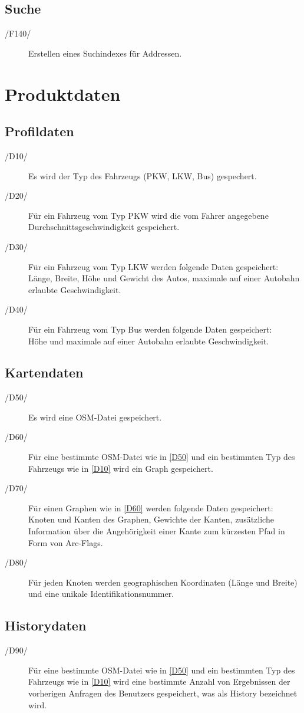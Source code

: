 \documentclass[a4paper, 11pt]{article}
\newcommand{\oitem}[1]{\item[/#1/\label{#1}]}
\begin{document}
\subsection{Suche}
\begin{description}
\oitem{F140}
Erstellen eines Suchindexes für Addressen.

\end{description}
\section{Produktdaten}
\subsection{Profildaten}
\begin{description}
\oitem{D10}
Es wird der Typ des Fahrzeugs (PKW, LKW, Bus) gespechert.
\oitem{D20}
Für ein Fahrzeug vom Typ  PKW wird die vom Fahrer angegebene Durchschnittsgeschwindigkeit gespeichert.
\oitem{D30}
Für ein Fahrzeug vom Typ  LKW werden folgende Daten gespeichert:\\
Länge, Breite, Höhe und Gewicht des Autos, maximale auf einer Autobahn erlaubte Geschwindigkeit.
\oitem{D40}
Für ein Fahrzeug vom Typ Bus werden folgende Daten gespeichert:\\
Höhe und maximale auf einer Autobahn erlaubte Geschwindigkeit.
\end{description}

\subsection{Kartendaten}
\begin{description}
\oitem{D50}
Es wird eine OSM-Datei gespeichert.
\oitem{D60}
Für eine bestimmte OSM-Datei wie in \ref{D50} und ein bestimmten Typ des Fahrzeugs wie in \ref{D10} wird ein Graph gespeichert.
\oitem{D70}
Für einen Graphen wie in \ref{D60} werden  folgende Daten gespeichert:\\
Knoten und Kanten des Graphen, Gewichte der Kanten, zusätzliche Information über die Angehörigkeit einer Kante zum kürzesten Pfad in Form von Arc-Flags.
\oitem{D80}
Für jeden Knoten werden geographischen Koordinaten (Länge und Breite) und eine unikale Identifikationsnummer.
\end{description}

\subsection{Historydaten}
\begin{description}
\oitem{D90}
Für eine bestimmte OSM-Datei wie in \ref{D50} und ein bestimmten Typ des Fahrzeugs wie in \ref{D10} wird eine bestimmte Anzahl von Ergebnissen der vorherigen Anfragen des Benutzers gespeichert, was als History bezeichnet wird.  
\end{description}
\end{document}
